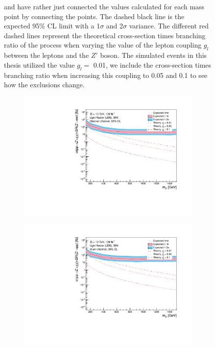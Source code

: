 \documentclass[12pt, a4paper]{book}
\begin{document}
\begin{figure}[!ht]
{   and have rather just connected the values calculated for each mass point by connecting the points. The dashed black line is the expected 95\% CL limit with a 1$\sigma$ and 2$\sigma$ variance. 
   The different red dashed lines represent the theoretical cross-section times branching ratio of the process when varying the value of the lepton coupling $g_l$ between the leptons and the $Z'$ boson. The simulated events in this thesis utilized the value $g_l=$ 0.01, we include the cross-section times branching ratio when increasing this coupling to 0.05 and 0.1 to see how the exclusions change.  }\label{fig:LV_LDS_exclusion_ee_uu}
\end{figure}

\begin{figure}[!ht]
	\centering
	\begin{subfigure}[b]{0.49\textwidth}
      \centering
      \includegraphics[width=1\textwidth]{Limits/Model_independent/50-100/LV_LDS/mass_exclusion_ee.pdf}
   \end{subfigure}
   \hfill
   \begin{subfigure}[b]{0.49\textwidth}
      \centering
      \includegraphics[width=1\textwidth]{Limits/Model_independent/50-100/LV_LDS/mass_exclusion_uu.pdf}

\end{subfigure}
\end{figure}
\end{document}
